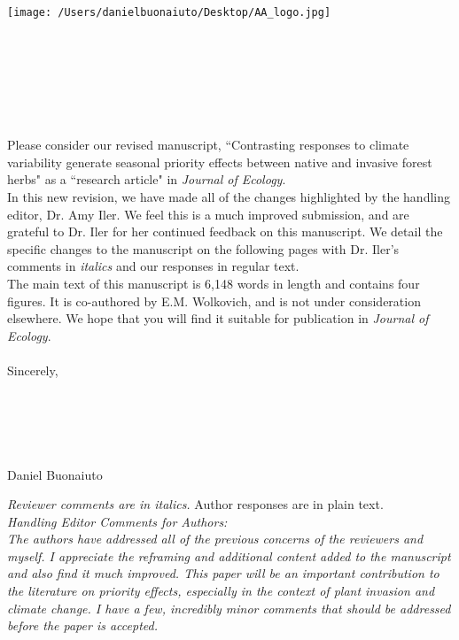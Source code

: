 \documentclass[12 pt]{article}
\begin{document}

\def\labelitemi{--}
\parindent=24pt
\noindent\texttt{[image: /Users/danielbuonaiuto/Desktop/AA\_logo.jpg]}
\\\\\\\\\\
\\\\
\vspace{1.5ex}

\noindent Please consider our revised manuscript, ``Contrasting responses to climate variability generate seasonal priority effects between native and invasive forest herbs" as a ``research article" in \textit{Journal of Ecology}.\\

\noindent In this new revision, we have made all of the changes highlighted by the handling editor, Dr. Amy Iler. We feel this is a much improved submission, and are grateful to Dr. Iler for her continued feedback on this manuscript. We detail the specific changes to the manuscript on the following pages with Dr. Iler's comments in \emph{italics} and our responses in regular text.\\

\noindent The main text of this manuscript is 6,148 words in length and contains four figures. It is co-authored by E.M. Wolkovich, and is not under consideration elsewhere. We hope that you will find it suitable for publication in \textit{Journal of Ecology}.\\\\

\noindent Sincerely,
\\\\\\\\\\\\

\noindent Daniel Buonaiuto

\pagebreak

\noindent \emph{Reviewer comments are in italics.} Author responses are in plain text. \\

\noindent \emph{Handling Editor Comments for Authors:}\\

\noindent \emph{The authors have addressed all of the previous concerns of the reviewers and myself. I appreciate the reframing and additional content added to the manuscript and also find it much improved. This paper will be an important contribution to the literature on priority effects, especially in the context of plant invasion and climate change. I have a few, incredibly minor comments that should be addressed before the paper is accepted.}\\ 
\end{document}
